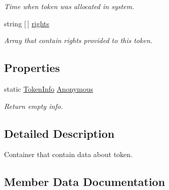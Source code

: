 \begin{DoxyCompactItemize}
\begin{DoxyCompactList}\small\item\em Time when token was allocated in system. \end{DoxyCompactList}\item 
string \mbox{[}$\,$\mbox{]} \mbox{\hyperlink{class_authority_controller_1_1_data_1_1_temporal_1_1_token_info_aa1919ec575894ea2ff957f87d3428dc7}{rights}}
\begin{DoxyCompactList}\small\item\em Array that contain rights provided to this token. \end{DoxyCompactList}\end{DoxyCompactItemize}
\subsection*{Properties}
\begin{DoxyCompactItemize}
\item 
static \mbox{\hyperlink{class_authority_controller_1_1_data_1_1_temporal_1_1_token_info}{Token\+Info}} \mbox{\hyperlink{class_authority_controller_1_1_data_1_1_temporal_1_1_token_info_acab070b9dcca472286bc953501989df0}{Anonymous}}
\begin{DoxyCompactList}\small\item\em Return empty info. \end{DoxyCompactList}\end{DoxyCompactItemize}


\subsection{Detailed Description}
Container that contain data about token. 



\subsection{Member Data Documentation}
\mbox{\label{class_authority_controller_1_1_data_1_1_temporal_1_1_token_info_acce187b055ae59b52d704b7dfcd4b74d}} 
